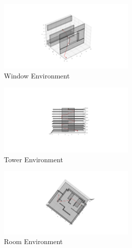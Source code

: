 \documentclass[conference]{IEEEtran}
\begin{document}
\begin{figure}[H]
    \centering
    \includegraphics[width=0.6\textwidth]{window_astar_o.png}
    \caption{Window Environment}
    \label{fig:window_astar_m}
\end{figure}
\begin{figure}[H]
    \centering
    \includegraphics[width=0.6\textwidth]{tower_astar_m.png}
    \caption{Tower Environment}
    \label{fig:tower_astar_m}
\end{figure}
\begin{figure}[H]
    \centering
    \includegraphics[width=0.6\textwidth]{room_astar_m.png}
    \caption{Room Environment}
    \label{fig:room_astar_m}
\end{figure}
\end{document}
